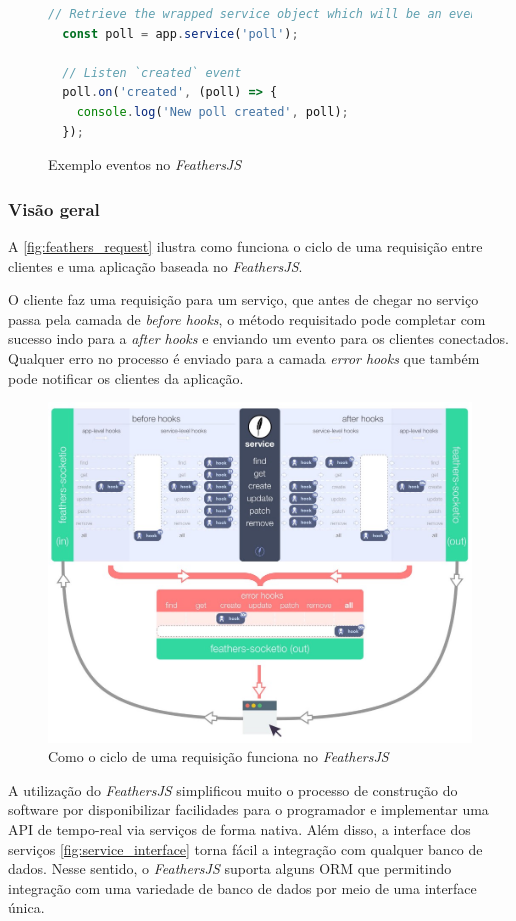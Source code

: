 \begin{figure}[h]
\begin{lstlisting}[language=JavaScript]
  // Retrieve the wrapped service object which will be an event emitter
  const poll = app.service('poll');

  // Listen `created` event
  poll.on('created', (poll) => {
    console.log('New poll created', poll);
  });
\end{lstlisting}
\caption{Exemplo eventos no \textit{\textit{FeathersJS}}}
\label{fig:events_example}
\end{figure}

\subsubsection{Visão geral}

A \autoref{fig:feathers_request} ilustra como funciona o ciclo de uma requisição
entre clientes e uma aplicação baseada no \textit{FeathersJS}.

O cliente faz uma requisição para um serviço, que antes de chegar no serviço passa
pela camada de \textit{before hooks}, o método requisitado pode completar com sucesso indo para a
\textit{after hooks} e enviando um evento para os clientes conectados. Qualquer erro no processo
é enviado para a camada \textit{error hooks} que também pode notificar os clientes da aplicação.

\begin{figure}
  \centering
  \includegraphics[scale=0.45,valign=t]{imagens/feathers_request.jpeg}
  \caption{Como o ciclo de uma requisição funciona no \textit{FeathersJS}}
  \label{fig:feathers_request}
\end{figure}

A utilização do \textit{FeathersJS} simplificou muito o processo de construção
do software por disponibilizar facilidades para o programador e implementar
uma API de tempo-real via serviços de forma nativa. Além disso, a interface dos
serviços \autoref{fig:service_interface} torna fácil a integração com qualquer banco de dados.
Nesse sentido, o \textit{FeathersJS} suporta alguns ORM que permitindo integração
com uma variedade de banco de dados por meio de uma interface única.

